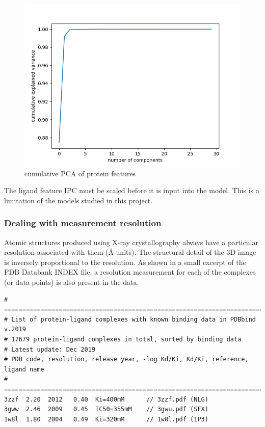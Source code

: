\documentclass[11pt]{article}
\begin{document}
\begin{figure}[htb]
  \centering
    \includegraphics[scale=0.7]{images/pcaproteinanalysis}
    \caption{cumulative PCA of protein features}
    \label{fig:pcaproteinanalysis}
\end{figure}

The ligand feature IPC must be scaled before it is input into the model. This is a limitation of the models studied in this project.

\subsubsection{Dealing with measurement resolution}
Atomic structures produced using X-ray crystallography always have a particular resolution associated with them (\si{\angstrom} units). The structural detail of the 3D image is inversely proportional to the resolution.
As shown in a small excerpt of the PDB Databank INDEX file, a resolution measurement for each of the complexes (or data points) is also present in the data.

\begin{verbatim}
# ==============================================================================
# List of protein-ligand complexes with known binding data in PDBbind v.2019
# 17679 protein-ligand complexes in total, sorted by binding data
# Latest update: Dec 2019
# PDB code, resolution, release year, -log Kd/Ki, Kd/Ki, reference, ligand name
# ==============================================================================
3zzf  2.20  2012   0.40  Ki=400mM      // 3zzf.pdf (NLG)
3gww  2.46  2009   0.45  IC50=355mM    // 3gwu.pdf (SFX)
1w8l  1.80  2004   0.49  Ki=320mM      // 1w8l.pdf (1P3)
\end{verbatim}
\end{document}
